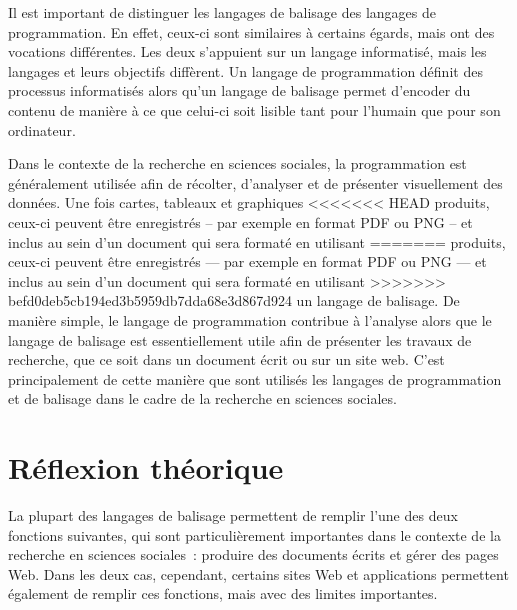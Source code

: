\documentclass[
  letterpaper,
]{scrbook}
\begin{document}
Il est important de distinguer les langages de balisage des langages de
programmation. En effet, ceux-ci sont similaires à certains égards, mais
ont des vocations différentes. Les deux s'appuient sur un langage
informatisé, mais les langages et leurs objectifs diffèrent. Un langage
de programmation définit des processus informatisés alors qu'un langage
de balisage permet d'encoder du contenu de manière à ce que celui-ci
soit lisible tant pour l'humain que pour son ordinateur.

Dans le contexte de la recherche en sciences sociales, la programmation
est généralement utilisée afin de récolter, d'analyser et de présenter
visuellement des données. Une fois cartes, tableaux et graphiques
<<<<<<< HEAD
produits, ceux-ci peuvent être enregistrés -- par exemple en format PDF
ou PNG -- et inclus au sein d'un document qui sera formaté en utilisant
=======
produits, ceux-ci peuvent être enregistrés --- par exemple en format PDF
ou PNG --- et inclus au sein d'un document qui sera formaté en utilisant
>>>>>>> befd0deb5cb194ed3b5959db7dda68e3d867d924
un langage de balisage. De manière simple, le langage de programmation
contribue à l'analyse alors que le langage de balisage est
essentiellement utile afin de présenter les travaux de recherche, que ce
soit dans un document écrit ou sur un site web. C'est principalement de
cette manière que sont utilisés les langages de programmation et de
balisage dans le cadre de la recherche en sciences sociales.

\hypertarget{ruxe9flexion-thuxe9orique-1}{%
\section{Réflexion théorique}\label{ruxe9flexion-thuxe9orique-1}}

La plupart des langages de balisage permettent de remplir l'une des deux
fonctions suivantes, qui sont particulièrement importantes dans le
contexte de la recherche en sciences sociales~: produire des documents
écrits et gérer des pages Web. Dans les deux cas, cependant, certains
sites Web et applications permettent également de remplir ces fonctions,
mais avec des limites importantes.
\end{document}
